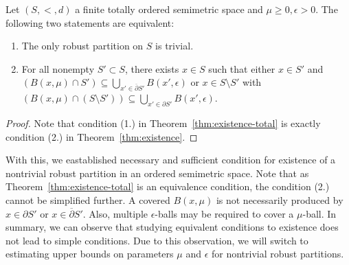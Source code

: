\begin{corollary}
    \label{cor:existence-total}
    Let $(S, <, d)$ a finite totally ordered semimetric space and $\mu \geq 0, \epsilon > 0$. The following two statements are equivalent:
    \begin{enumerate}
        \item The only robust partition on $S$ is trivial.
        \item For all nonempty $S' \subset S$, there exists $x \in S$ such that either $x \in S'$ and $(B(x,\mu) \cap S') \subseteq \bigcup_{x' \in \overline{\partial}S'} B(x', \epsilon)$ or $x \in S \setminus S'$ with $(B(x,\mu) \cap (S \setminus S')) \subseteq \bigcup_{x' \in \partial S'} B(x', \epsilon)$.
    \end{enumerate}
\end{corollary}

\begin{proof}
    Note that condition (1.) in Theorem~\ref{thm:existence-total} is exactly condition (2.) in Theorem~\ref{thm:existence}.
\end{proof}

With this, we eastablished necessary and sufficient condition for existence of a nontrivial robust partition in an ordered semimetric space. Note that as Theorem~\ref{thm:existence-total} is an equivalence condition, the condition (2.) cannot be simplified further. A covered $B(x, \mu)$ is not necessarily produced by $x \in \partial S'$ or $x \in \overline{\partial} S'$. Also, multiple $\epsilon$-balls may be required to cover a $\mu$-ball. In summary, we can observe that studying equivalent conditions to existence does not lead to simple conditions. Due to this observation, we will switch to estimating upper bounds on parameters $\mu$ and $\epsilon$ for nontrivial robust partitions.



